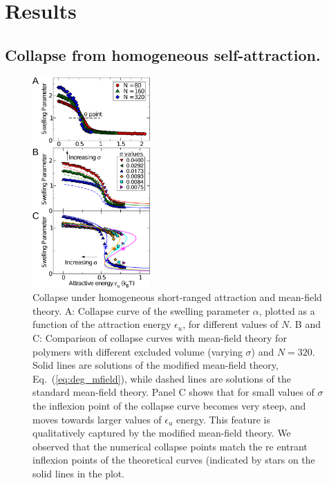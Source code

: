 \documentclass[
preprint,
a4paper,
12pt,
superscriptaddress,
pre]{revtex4}
\begin{document}
\section{Results}


\subsection*{Collapse from homogeneous self-attraction. }


\begin{figure}
  \centering
  \includegraphics[width=0.4\textwidth]{fig2}
  \caption{Collapse under homogeneous short-ranged attraction and
    mean-field theory. A: Collapse curve of the swelling parameter
    $\alpha$, plotted as a function of the attraction energy
    $\epsilon_u$, for different values of $N$. B and C: Comparison of
    collapse curves with mean-field theory for polymers with different
    excluded volume (varying $\sigma$) and $N=320$.  Solid lines are
    solutions of the modified mean-field theory,
    Eq.~(\ref{eq:deg_mfield}), while dashed lines are solutions of the
    standard mean-field theory. Panel C shows that for small values of
    $\sigma$ the inflexion point of the collapse curve becomes very
    steep, and moves towards larger values of $\epsilon_u$
    energy. This feature is qualitatively captured by the modified
    mean-field theory. We observed that the numerical collapse points
    match the re entrant inflexion points of the theoretical curves
    (indicated by stars on the solid lines in the plot.  }
  \label{fig:2}
\end{figure}
\end{document}
